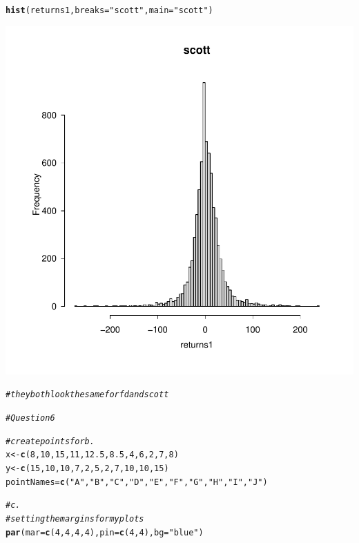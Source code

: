 \documentclass{article}\usepackage[]{graphicx}\usepackage[]{xcolor}
\makeatletter
\newcommand{\hlnum}[1]{\textcolor[rgb]{0.686,0.059,0.569}{#1}}%
\newcommand{\hlstr}[1]{\textcolor[rgb]{0.192,0.494,0.8}{#1}}%
\newcommand{\hlcom}[1]{\textcolor[rgb]{0.678,0.584,0.686}{\textit{#1}}}%
\newcommand{\hlstd}[1]{\textcolor[rgb]{0.345,0.345,0.345}{#1}}%
\newcommand{\hlkwb}[1]{\textcolor[rgb]{0.69,0.353,0.396}{#1}}%
\newcommand{\hlkwc}[1]{\textcolor[rgb]{0.333,0.667,0.333}{#1}}%
\newcommand{\hlkwd}[1]{\textcolor[rgb]{0.737,0.353,0.396}{\textbf{#1}}}%
\newenvironment{kframe}{%
 \def\at@end@of@kframe{}%
 \ifinner\ifhmode%
  \def\at@end@of@kframe{\end{minipage}}%
  \begin{minipage}{\columnwidth}%
 \fi\fi%
 \def\FrameCommand##1{\hskip\@totalleftmargin \hskip-\fboxsep
 \colorbox{shadecolor}{##1}\hskip-\fboxsep
     \hskip-\linewidth \hskip-\@totalleftmargin \hskip\columnwidth}%
 \MakeFramed {\advance\hsize-\width
   \@totalleftmargin\z@ \linewidth\hsize
   \@setminipage}}%
 {\par\unskip\endMakeFramed%
 \at@end@of@kframe}
\newenvironment{knitrout}{}{} %
\makeatother
\begin{document}
\begin{knitrout}
{}


\begin{kframe}\begin{alltt}
\hlkwd{hist}\hlstd{(returns1,} \hlkwc{breaks} \hlstd{=} \hlstr{"scott"}\hlstd{,} \hlkwc{main} \hlstd{=} \hlstr{"scott"}\hlstd{)}
\end{alltt}
\end{kframe}

{\centering \includegraphics[width=.6\linewidth]{figure/Meng51940633A4-Rnwauto-report-7} 

}


\begin{kframe}\begin{alltt}
\hlcom{# they both look the same for fd and scott}

\hlcom{#Question 6}

\hlcom{# create points for b.}
\hlstd{x} \hlkwb{<-} \hlkwd{c}\hlstd{(}\hlnum{8}\hlstd{,} \hlnum{10}\hlstd{,} \hlnum{15}\hlstd{,} \hlnum{11}\hlstd{,} \hlnum{12.5}\hlstd{,} \hlnum{8.5}\hlstd{,} \hlnum{4}\hlstd{,} \hlnum{6}\hlstd{,} \hlnum{2}\hlstd{,} \hlnum{7}\hlstd{,} \hlnum{8}\hlstd{)}
\hlstd{y} \hlkwb{<-} \hlkwd{c}\hlstd{(}\hlnum{15}\hlstd{,} \hlnum{10}\hlstd{,} \hlnum{10}\hlstd{,} \hlnum{7}\hlstd{,} \hlnum{2}\hlstd{,} \hlnum{5}\hlstd{,} \hlnum{2}\hlstd{,} \hlnum{7}\hlstd{,} \hlnum{10}\hlstd{,} \hlnum{10}\hlstd{,} \hlnum{15}\hlstd{)}
\hlstd{pointNames} \hlkwb{=} \hlkwd{c}\hlstd{(}\hlstr{"A"}\hlstd{,}\hlstr{"B"}\hlstd{,}\hlstr{"C"}\hlstd{,}\hlstr{"D"}\hlstd{,}\hlstr{"E"}\hlstd{,}\hlstr{"F"}\hlstd{,}\hlstr{"G"}\hlstd{,}\hlstr{"H"}\hlstd{,}\hlstr{"I"}\hlstd{,}\hlstr{"J"}\hlstd{)}

\hlcom{# c.}
\hlcom{# setting the margins for my plots}
\hlkwd{par}\hlstd{(}\hlkwc{mar} \hlstd{=} \hlkwd{c}\hlstd{(}\hlnum{4}\hlstd{,} \hlnum{4}\hlstd{,} \hlnum{4}\hlstd{,} \hlnum{4}\hlstd{),} \hlkwc{pin} \hlstd{=} \hlkwd{c}\hlstd{(}\hlnum{4}\hlstd{,} \hlnum{4}\hlstd{),}\hlkwc{bg}\hlstd{=}\hlstr{"blue"}\hlstd{)}


\end{alltt}
\end{kframe}
\end{knitrout}
\end{document}
